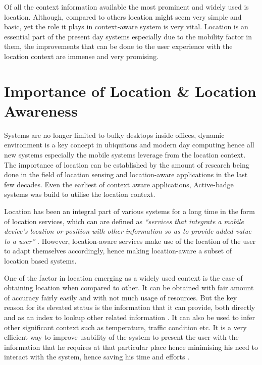 \documentclass[12pt]{report}
\begin{document}
Of all the context information available the most prominent and widely used is location. Although, compared to others location might seem very simple and basic, yet the role it plays in context-aware system is very vital. Location is an essential part of the present day systems especially due to the mobility factor in them, the improvements that can be done to the user experience with the location context are immense and very promising.

\section{Importance of Location \& Location Awareness}

Systems are no longer limited to bulky desktops inside offices, dynamic environment is a key concept in ubiquitous and modern day computing hence all new systems especially the mobile systems leverage from the location context. The importance of location can be established by the amount of research being done in the field of location sensing and location-aware applications in the last few decades. Even the earliest of context aware applications, Active-badge systems \cite{want1992active} was build to utilise the location context.


Location has been an integral part of various systems for a long time in the form of location services, which can are defined as \textit{``services that integrate a mobile device's location or position with other information so as to provide added value to a user''} \cite{schiller2004location}. However, location-aware services make use of the location of the user to adapt themselves accordingly, hence making location-aware a subset of location based systems. 


One of the factor in location emerging as a widely used context is the ease of obtaining location when compared to other. It can be obtained with fair amount of accuracy fairly easily and with not much usage of resources. But the key reason for its elevated status is the information that it can provide, both directly and as an index to lookup other related information \cite{schilit1995system}. It can also be used to infer other significant context such as temperature, traffic condition etc. It is a very efficient way to improve usability of the system to present the user with the information that he requires at that particular place hence minimising his need to interact with the system, hence saving his time and efforts \cite{kaasinen2003user}.
\end{document}
